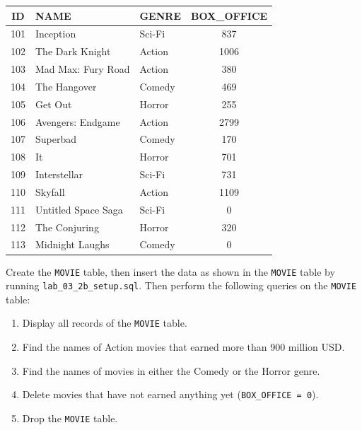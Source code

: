 \documentclass[12pt,a4paper]{article}
\begin{document}
    \begin{table}[h!]\centering
    \begin{tabular}{|c|l|l|c|}
        \hline
        \textbf{ID} & \textbf{NAME} & \textbf{GENRE} & \textbf{BOX\_OFFICE} \\ \hline
        101 & Inception & Sci-Fi & 837 \\
        102 & The Dark Knight & Action & 1006 \\
        103 & Mad Max: Fury Road & Action & 380 \\
        104 & The Hangover & Comedy & 469 \\
        105 & Get Out & Horror & 255 \\
        106 & Avengers: Endgame & Action & 2799 \\
        107 & Superbad & Comedy & 170 \\
        108 & It & Horror & 701 \\
        109 & Interstellar & Sci-Fi & 731 \\
        110 & Skyfall & Action & 1109 \\
        111 & Untitled Space Saga & Sci-Fi & 0 \\
        112 & The Conjuring & Horror & 320 \\
        113 & Midnight Laughs & Comedy & 0 \\ \hline
    \end{tabular}
    \end{table}

\noindent Create the \texttt{MOVIE} table, then insert the data as shown in the \texttt{MOVIE} table by running \texttt{lab\_03\_2b\_setup.sql}. Then perform the following queries on the \texttt{MOVIE} table:
\begin{enumerate}
    \item Display all records of the \texttt{MOVIE} table.
    \item Find the names of Action movies that earned more than 900 million USD.
    \item Find the names of movies in either the Comedy or the Horror genre.
    \item Delete movies that have not earned anything yet (\texttt{BOX\_OFFICE = 0}).
    \item Drop the \texttt{MOVIE} table.

\end{enumerate}
\end{document}
